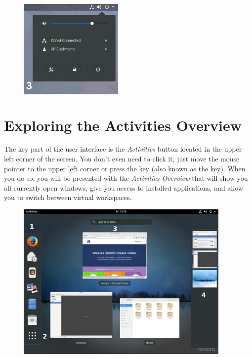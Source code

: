\begin{enumerate}
\begin{figure}[tbp]
\begin{center}
\includegraphics[width=0.45\textwidth]{img/menu}
 \label{fig:menu}
\end{center}
\end{figure}

\end{enumerate}

\section*{Exploring the Activities Overview}

The key part of the user interface is the \emph{Activities} button located in the upper left corner of the screen. You don't even need to click it, just move the mouse pointer to the upper left corner or press the  key (also known as the  key). When you do so, you will be presented with the \emph{Activities Overview} that will show you all currently open windows, give you access to installed applications, and allow you to switch between virtual workspaces.

\begin{figure}[t]
\begin{center}
\includegraphics[width=0.93\textwidth]{img/shell-b}
 \label{fig:shell-b}
\end{center}
\end{figure}


